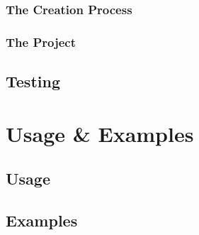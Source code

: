 \subsubsection{The Creation Process}
\lipsum[7-9]
\subsubsection{The Project}
\lipsum[9-13]
\subsection{Testing}
\lipsum[18-20]


\section{Usage \& Examples}
\lipsum[9-10]
\subsection{Usage}
\lipsum[18-20]
\subsection{Examples}
\lipsum[3-4]